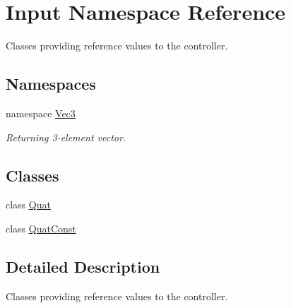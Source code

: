 \hypertarget{namespaceInput}{\section{\-Input \-Namespace \-Reference}
\label{namespaceInput}
}


\-Classes providing reference values to the controller.  


\subsection*{\-Namespaces}
\begin{DoxyCompactItemize}
\item 
namespace \hyperlink{namespaceInput_1_1Vec3}{\-Vec3}
\begin{DoxyCompactList}\small\item\em \-Returning 3-\/element vector. \end{DoxyCompactList}\end{DoxyCompactItemize}
\subsection*{\-Classes}
\begin{DoxyCompactItemize}
\item 
class \hyperlink{classInput_1_1Quat}{\-Quat}
\item 
class \hyperlink{classInput_1_1QuatConst}{\-Quat\-Const}
\end{DoxyCompactItemize}


\subsection{\-Detailed \-Description}
\-Classes providing reference values to the controller. 